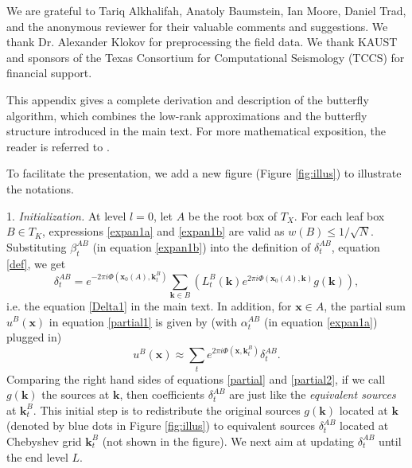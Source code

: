 We are grateful to Tariq Alkhalifah, Anatoly Baumstein, Ian Moore, Daniel Trad, and the anonymous reviewer for their valuable comments and suggestions. We thank Dr. Alexander Klokov for preprocessing the field data. We thank KAUST and sponsors of the Texas Consortium for Computational Seismology (TCCS) for financial support. 





This appendix gives a complete derivation and description of the butterfly algorithm, which combines the low-rank approximations and the butterfly structure introduced in the main text. For more mathematical exposition, the reader is referred to \cite{CDY09}.


To facilitate the presentation, we add a new figure (Figure \ref{fig:illus}) to illustrate the notations.

1. {\it Initialization.} At level $l=0$, let $A$ be the root box of $T_X$. For each leaf box $B\in T_K$, expressions \ref{expan1a} and \ref{expan1b} are valid as $w(B)\leq 1/\sqrt{N}$. Substituting $\beta_t^{AB}$ (in equation \ref{expan1b}) into the definition of $\delta_t^{AB}$, equation \ref{def}, we get
\begin{equation} \label{delta1}
\delta_t^{AB}=e^{-2\pi i
  \Phi(\mathbf{x}_0(A),\mathbf{k}_t^B)}\sum_{\mathbf{k}\in B}\left(
  L_t^B(\mathbf{k}) e^{2\pi i \Phi(\mathbf{x}_0(A),\mathbf{k})}g(\mathbf{k}) \right),
\end{equation}
i.e. the equation \ref{Delta1} in the main text. In addition, for $\mathbf{x}\in A$, the partial sum $u^B(\mathbf{x})$ in equation \ref{partial1} is given by (with $\alpha_t^{AB}$ (in equation \ref{expan1a}) plugged in)
\begin{equation} \label{partial2}
u^{B}(\mathbf{x}) \approx
\sum_t e^{2\pi i
  \Phi(\mathbf{x},\mathbf{k}_t^B)}\delta_t^{AB}.
\end{equation}
Comparing the right hand sides of equations \ref{partial} and \ref{partial2}, if we call $g(\mathbf{k})$ the sources at $\mathbf{k}$, then coefficients $\delta_t^{AB}$ are just like the {\it equivalent sources} at $\mathbf{k}_t^B$. This initial step is to redistribute the original sources $g(\mathbf{k})$ located at $\mathbf{k}$ (denoted by blue dots in Figure \ref{fig:illus}) to equivalent sources $\delta^{AB}_t$ located at Chebyshev grid $\mathbf{k}_t^B$ (not shown in the figure). We next aim at updating $\delta_t^{AB}$ until the end level $L$.

